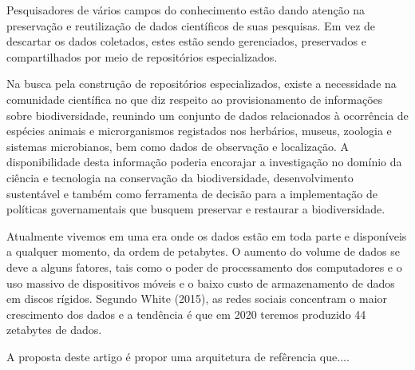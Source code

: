 \documentclass[conference]{IEEEtran}
\begin{document}
Pesquisadores de v\'{a}rios campos do conhecimento est\~{a}o dando aten\c{c}\~{a}o na  preserva\c{c}\~{a}o e reutiliza\c{c}\~{a}o de dados cient\'{i}ficos de suas pesquisas. Em vez de descartar os dados coletados, estes est\~{a}o sendo gerenciados, preservados e compartilhados por meio de reposit\'{o}rios especializados\cite{Fu:2017}.

Na busca pela constru\c{c}\~{a}o de reposit\'{o}rios especializados, existe a necessidade na comunidade cient\'{i}fica no que diz respeito ao provisionamento de informa\c{c}\~{o}es sobre biodiversidade, reunindo um conjunto de dados relacionados \`{a} ocorr\^{e}ncia de esp\'{e}cies animais e microrganismos registados nos herb\'{a}rios, museus, zoologia e sistemas microbianos, bem como dados de observa\c{c}\~{a}o e localiza\c{c}\~{a}o. A disponibilidade desta informa\c{c}\~{a}o poderia encorajar a investiga\c{c}\~{a}o no dom\'{i}nio da ci\^{e}ncia e tecnologia  na conserva\c{c}\~{a}o da biodiversidade, desenvolvimento sustent\'{a}vel e tamb\'{e}m como ferramenta de decis\~{a}o para a implementa\c{c}\~{a}o de pol\'{i}ticas governamentais que busquem preservar e restaurar a biodiversidade\cite{Peterson:2015}.

Atualmente vivemos em uma era onde os dados est\~{a}o em toda parte e dispon\'{i}veis a qualquer momento, da ordem de petabytes\cite{White:2015}. O aumento do volume de dados se deve a alguns fatores, tais como o poder de processamento dos computadores e o uso massivo de dispositivos m\'{o}veis e o baixo custo de armazenamento de dados em discos r\'{i}gidos\cite{Marquesone:2014}. Segundo White (2015), as redes sociais concentram o maior crescimento dos dados e a tendência é que em 2020 teremos produzido 44 zetabytes de dados.


A proposta deste artigo \'{e} propor uma arquitetura de ref\^{e}rencia que.... %
\end{document}
